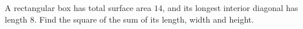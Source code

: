 A rectangular box has total surface area $14$, and its longest interior diagonal has length $8$. Find the square of the sum of its length, width and height.
